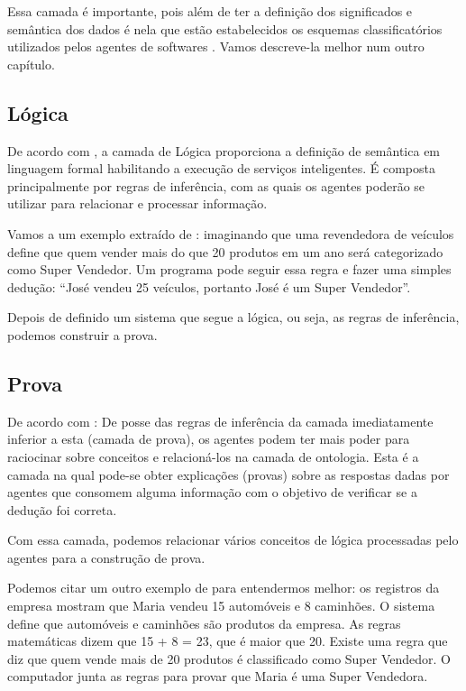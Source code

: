 Essa camada é importante, pois além de ter a definição dos significados e semântica dos dados é nela que estão estabelecidos os esquemas classificatórios utilizados pelos agentes de softwares \cite{santarem}. Vamos descreve-la melhor num outro capítulo.

\subsection{Lógica}

De acordo com \cite{rosa}, a camada de Lógica proporciona a definição de semântica em linguagem formal habilitando a execução de serviços inteligentes. É composta principalmente por regras de inferência, com as quais os agentes poderão se utilizar para relacionar e processar informação. 

Vamos a um exemplo extraído de \cite{ferneda}: imaginando que uma revendedora de veículos define que quem vender mais do que 20 produtos em um ano será categorizado como Super Vendedor. Um programa pode seguir essa regra e fazer uma simples dedução: “José vendeu 25 veículos, portanto José é um Super Vendedor”. 

Depois de definido um sistema que segue a lógica, ou seja, as regras de inferência, podemos construir a prova.

\subsection{Prova}

De acordo com \cite{rosa}: De posse das regras de inferência da camada imediatamente inferior a esta (camada de prova), os agentes podem ter mais poder para raciocinar sobre conceitos e relacioná-los na camada de ontologia. Esta é a camada na qual pode-se obter explicações (provas) sobre as respostas dadas por agentes que consomem alguma informação com o objetivo de verificar se a dedução foi correta.

Com essa camada, podemos relacionar vários conceitos de lógica processadas pelo agentes para a construção de prova.

Podemos citar um outro exemplo de \cite{ferneda} para entendermos melhor: os registros da empresa mostram que Maria vendeu 15 automóveis e 8 caminhões. O sistema define que automóveis e caminhões são produtos da empresa. As regras matemáticas dizem que 15 + 8 = 23, que é maior que 20. Existe uma regra que diz que quem vende mais de 20 produtos é classificado como Super Vendedor. O computador junta as regras para provar que Maria é uma Super Vendedora. 

